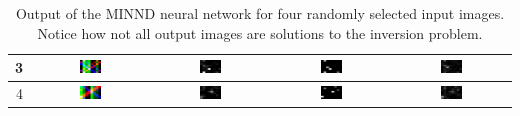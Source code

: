 \documentclass[twoside]{article}
\begin{document}
\begin{table}[H]
\begin{tabular}{| r | c | c | c | c |}
3 & 
\includegraphics[width=0.2\textwidth]{images/8x8/3/in} &
\includegraphics[width=0.2\textwidth]{images/8x8/3/out} &
\includegraphics[width=0.2\textwidth]{images/8x8/3/truth} &
\includegraphics[width=0.2\textwidth]{images/8x8/3/dif} \\ \hline
4 & 
\includegraphics[width=0.2\textwidth]{images/8x8/4/in} &
\includegraphics[width=0.2\textwidth]{images/8x8/4/out} &
\includegraphics[width=0.2\textwidth]{images/8x8/4/truth} &
\includegraphics[width=0.2\textwidth]{images/8x8/4/dif} \\ \hline
\end{tabular}
\caption{Output of the MINND neural network for four randomly selected input images. Notice how not all output images are solutions to the inversion problem.}
\end{table}
\end{document}
